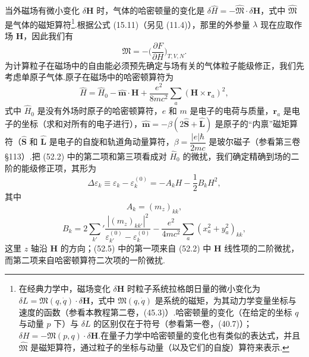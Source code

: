 当外磁场有微小变化 $\delta\boldsymbol{H}$ 时，气体的哈密顿量的变化是 $\delta\hat{H}=-\hat{\mathfrak{M}}\cdot\delta\boldsymbol{H}$，式中 $\hat{\mathfrak{M}}$ 是气体的磁矩算符\footnote{在经典力学中，磁场变化 $\delta\boldsymbol{H}$ 时粒子系统拉格朗日量的微小变化为 $\delta L=\mathfrak{M}(q,\dot{q})\cdot\delta\boldsymbol{H}$，式中 $\mathfrak{M}(q,\dot{q})$ 是系统的磁矩，为其动力学变量坐标与速度的函数（参看本教程第二卷，(45.3)）.哈密顿量的变化（在给定的坐标 $q$ 与动量 $p$ 下）与 $\delta L$ 的区别仅在于符号（参看第一卷，(40.7)）；$\delta H=-\mathfrak{M}(p,q)\cdot\delta\boldsymbol{H}$.在量子力学中哈密顿量的变化也有类似的表达式，并且 $\hat{\mathfrak{M}}$ 是磁矩算符，通过粒子的坐标与动量（以及它们的自旋）算符来表示.}.根据公式 (15.11)（另见 (11.4)），那里的外参量 $\lambda$ 现在应取作场 $\boldsymbol{H}$，因此我们有
\begin{equation}
  \mathfrak{M}=-\Big(\frac{\partial F}{\partial H}\Big)_{T,V,N}.
\end{equation}
为计算粒子在磁场中的自由能必须预先确定与场有关的气体粒子能级修正，我们先考虑单原子气体.原子在磁场中的哈密顿算符为
\begin{equation}
  \hat{H}=\hat{H}_0-\hat{\boldsymbol{m}}\cdot\boldsymbol{H}
  +\frac{e^2}{8mc^2}\sum_a\left(\boldsymbol{H}\times\boldsymbol{r}_a\right)^2,
\end{equation}
式中 $\hat{H}_0$ 是没有外场时原子的哈密顿算符，$e$ 和 $m$ 是电子的电荷与质量，$\boldsymbol{r}_a$ 是电子的坐标（求和对所有的电子进行），$\hat{\boldsymbol{m}}=-\beta\left(2\hat{\boldsymbol{S}}+\hat{\boldsymbol{L}}\right)$ 是原子的“内禀”磁矩算符（$\hat{\boldsymbol{S}}$ 和 $\hat{\boldsymbol{L}}$ 是电子的自旋和轨道角动量算符，$\beta=\dfrac{|e|\hbar}{2mc}$ 是玻尔磁子（参看第三卷§113）.把 (52.2) 中的第二项和第三项看成对 $\hat{H}_0$ 的微扰，我们确定精确到场的二阶的能级修正项，其形为
\begin{equation}
  \Delta\varepsilon_k\equiv\varepsilon_k-\varepsilon_k^{(0)}
  =-A_kH-\frac{1}{2}B_kH^2,
\end{equation}
其中
\begin{equation}
  A_k=\left(m_z\right)_{kk},
\end{equation}
\begin{equation}
  B_k=2\sum_{k'}{}'
  \frac{\left|\left(m_z\right)_{kk'}\right|^2}
  {\varepsilon_{k'}^{(0)}-\varepsilon_k^{(0)}}
  -\frac{e^2}{4mc^2}\sum_a\left(x_a^2+y_a^2\right)_{kk},
\end{equation}
这里 $z$ 轴沿 $\boldsymbol{H}$ 的方向；(52.5) 中的第一项来自 (52.2) 中 $\boldsymbol{H}$ 线性项的二阶微扰，而第二项来自哈密顿算符二次项的一阶微扰.

